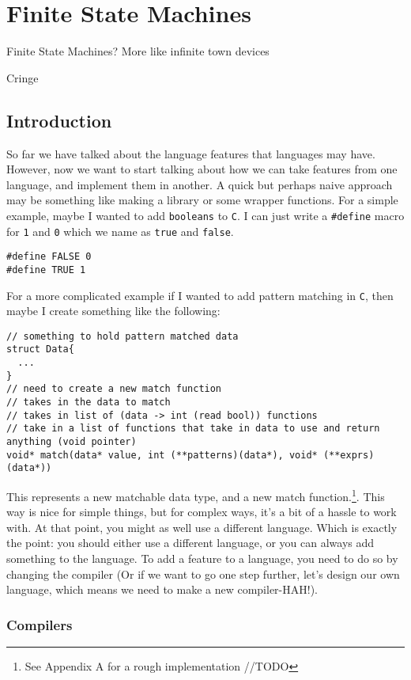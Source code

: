 \documentclass[main.tex]{subfiles}
\begin{document}
\chapter{Finite State Machines}
\epigraph{Finite State Machines? More like infinite town devices}{Cringe}
\section{Introduction}
So far we have talked about the language features that languages may have. 
However, now we want to start talking about how we can take features from one language, and implement them in another. A quick but perhaps naive approach may be something like making a library or some wrapper functions. For a simple example, maybe I wanted to add \texttt{booleans} to \texttt{C}. I can just write a \texttt{\#define} macro for \texttt{1} and \texttt{0} which we name as \texttt{true} and \texttt{false}. 
\begin{lstlisting}[style=MyCStyle]
#define FALSE 0
#define TRUE 1
\end{lstlisting}
For a more complicated example if I wanted to add pattern matching in \texttt{C}, then maybe I create something like the following:
\begin{lstlisting}[style=MyCStyle]
// something to hold pattern matched data
struct Data{
  ...
}
// need to create a new match function
// takes in the data to match
// takes in list of (data -> int (read bool)) functions
// take in a list of functions that take in data to use and return anything (void pointer)
void* match(data* value, int (**patterns)(data*), void* (**exprs)(data*))

\end{lstlisting}This represents a new matchable data type, and a new match function.\footnote{See Appendix A for a rough implementation //TODO}. This way is nice for simple things, but for complex ways, it's a bit of a hassle to work with. At that point, you might as well use a different language. Which is exactly the point: you should either use a different language, or you can always add something to the language. To add a feature to a language, you need to do so by changing the compiler (Or if we want to go one step further, let's design our own language, which means we need to make a new compiler-HAH!).

\subsection{Compilers}
\end{document}
